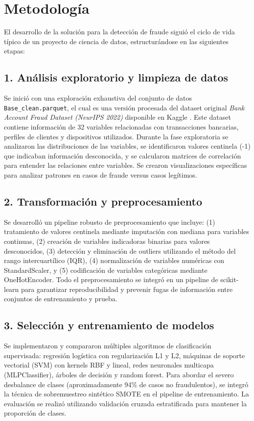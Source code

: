 \documentclass{llncs}
\begin{document}
\section{Metodología}

El desarrollo de la solución para la detección de fraude siguió el ciclo de vida típico de un proyecto de ciencia de datos, estructurándose en las siguientes etapas:

\subsection{1. Análisis exploratorio y limpieza de datos}
Se inició con una exploración exhaustiva del conjunto de datos \texttt{Base\_clean.parquet}, el cual es una versión procesada del dataset original \textit{Bank Account Fraud Dataset (NeurIPS 2022)} disponible en Kaggle \cite{dataset}. Este dataset contiene información de 32 variables relacionadas con transacciones bancarias, perfiles de clientes y dispositivos utilizados. Durante la fase exploratoria se analizaron las distribuciones de las variables, se identificaron valores centinela (-1) que indicaban información desconocida, y se calcularon matrices de correlación para entender las relaciones entre variables. Se crearon visualizaciones específicas para analizar patrones en casos de fraude versus casos legítimos.

\subsection{2. Transformación y preprocesamiento}
Se desarrolló un pipeline robusto de preprocesamiento que incluye: (1) tratamiento de valores centinela mediante imputación con mediana para variables continuas, (2) creación de variables indicadoras binarias para valores desconocidos, (3) detección y eliminación de outliers utilizando el método del rango intercuartílico (IQR), (4) normalización de variables numéricas con StandardScaler, y (5) codificación de variables categóricas mediante OneHotEncoder. Todo el preprocesamiento se integró en un pipeline de scikit-learn para garantizar reproducibilidad y prevenir fugas de información entre conjuntos de entrenamiento y prueba.

\subsection{3. Selección y entrenamiento de modelos}
Se implementaron y compararon múltiples algoritmos de clasificación supervisada: regresión logística con regularización L1 y L2, máquinas de soporte vectorial (SVM) con kernels RBF y lineal, redes neuronales multicapa (MLPClassifier), árboles de decisión y random forest. Para abordar el severo desbalance de clases (aproximadamente 94\% de casos no fraudulentos), se integró la técnica de sobremuestreo sintético SMOTE en el pipeline de entrenamiento. La evaluación se realizó utilizando validación cruzada estratificada para mantener la proporción de clases.
\end{document}
